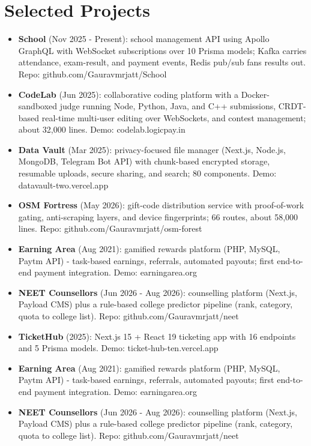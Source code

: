 \documentclass[11pt,a4paper,sans]{moderncv}
\begin{document}
\section{Selected Projects}
\vspace{1pt}
\begin{itemize}
    \item {\textbf{School} (Nov 2025 - Present): school management API using Apollo GraphQL with WebSocket subscriptions over 10 Prisma models; Kafka carries attendance, exam-result, and payment events, Redis pub/sub fans results out. Repo: github.com/Gauravmrjatt/School}
    \item {\textbf{CodeLab} (Jun 2025): collaborative coding platform with a Docker-sandboxed judge running Node, Python, Java, and C++ submissions, CRDT-based real-time multi-user editing over WebSockets, and contest management; about 32,000 lines. Demo: codelab.logicpay.in}
    \item {\textbf{Data Vault} (Mar 2025): privacy-focused file manager (Next.js, Node.js, MongoDB, Telegram Bot API) with chunk-based encrypted storage, resumable uploads, secure sharing, and search; 80 components. Demo: datavault-two.vercel.app}
    \item {\textbf{OSM Fortress} (May 2026): gift-code distribution service with proof-of-work gating, anti-scraping layers, and device fingerprints; 66 routes, about 58,000 lines. Repo: github.com/Gauravmrjatt/osm-forest}
\item {\textbf{Earning Area} (Aug 2021): gamified rewards platform (PHP, MySQL, Paytm API) - task-based earnings, referrals, automated payouts; first end-to-end payment integration. Demo: earningarea.org}
    \item {\textbf{NEET Counsellors} (Jun 2026 - Aug 2026): counselling platform (Next.js, Payload CMS) plus a rule-based college predictor pipeline (rank, category, quota to college list). Repo: github.com/Gauravmrjatt/neet}
    \item {\textbf{TicketHub} (2025): Next.js 15 + React 19 ticketing app with 16 endpoints and 5 Prisma models. Demo: ticket-hub-ten.vercel.app}
    \item {\textbf{Earning Area} (Aug 2021): gamified rewards platform (PHP, MySQL, Paytm API) - task-based earnings, referrals, automated payouts; first end-to-end payment integration. Demo: earningarea.org}
    \item {\textbf{NEET Counsellors} (Jun 2026 - Aug 2026): counselling platform (Next.js, Payload CMS) plus a rule-based college predictor pipeline (rank, category, quota to college list). Repo: github.com/Gauravmrjatt/neet}


\end{itemize}
\end{document}
